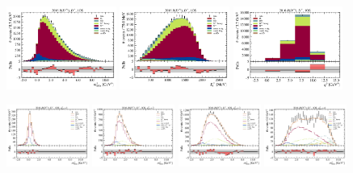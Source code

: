 \begin{figure}[htb]
    \centering
    \includegraphics[width=0.32\textwidth]{./figs-supplemental-plots/pre-ctrl-fit/stacked/fit_result-stacked-Dst-1os-mmiss2.pdf}
    \includegraphics[width=0.32\textwidth]{./figs-supplemental-plots/pre-ctrl-fit/stacked/fit_result-stacked-Dst-1os-el.pdf}
    \includegraphics[width=0.32\textwidth]{./figs-supplemental-plots/pre-ctrl-fit/stacked/fit_result-stacked-Dst-1os-q2.pdf}

    \includegraphics[width=0.24\textwidth]{./figs-supplemental-plots/pre-ctrl-fit/lines_q2_slices/fit_result-lines_q2_idx1-Dst-1os-mmiss2.pdf}
    \includegraphics[width=0.24\textwidth]{./figs-supplemental-plots/pre-ctrl-fit/lines_q2_slices/fit_result-lines_q2_idx2-Dst-1os-mmiss2.pdf}
    \includegraphics[width=0.24\textwidth]{./figs-supplemental-plots/pre-ctrl-fit/lines_q2_slices/fit_result-lines_q2_idx3-Dst-1os-mmiss2.pdf}
    \includegraphics[width=0.24\textwidth]{./figs-supplemental-plots/pre-ctrl-fit/lines_q2_slices/fit_result-lines_q2_idx4-Dst-1os-mmiss2.pdf}


\end{figure}
